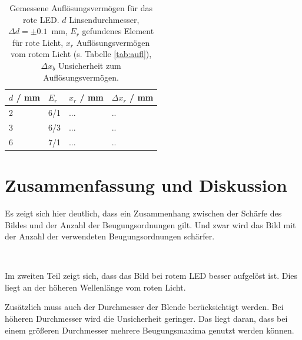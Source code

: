 \documentclass{article}
\begin{document}
\begin{table}[H]
\caption{Gemessene Auflösungsvermögen für das rote LED. $d$ Linsendurchmesser, $\Delta d = \pm 0.1$~mm, $E_r$ gefundenes Element für rote Licht, $x_r$ Auflösungsvermögen vom rotem Licht (s. Tabelle \ref{tab:aufl}), $\Delta x_b$ Unsicherheit zum Auflösungsvermögen.}

\begin{tabular}{llll}
$d$ / mm & $E_r$ & $x_r$ / mm & $\Delta x_r$ / mm \\
\hline
2 & 6/1 & ... & .. \\
3 & 6/3 & ... & .. \\
6 & 7/1 & ... & .. 
\end{tabular}
\end{table}






\section{Zusammenfassung und Diskussion}

Es zeigt sich hier deutlich, dass ein Zusammenhang zwischen der Schärfe des Bildes und der Anzahl der Beugungsordnungen gilt. Und zwar wird das Bild mit der Anzahl der verwendeten Beugungsordnungen schärfer.

~

Im zweiten Teil zeigt sich, dass das Bild bei rotem LED besser aufgelöst ist. Dies liegt an der höheren Wellenlänge vom roten Licht.

Zusätzlich muss auch der Durchmesser der Blende berücksichtigt werden. Bei höheren Durchmesser wird die Unsicherheit geringer. Das liegt daran, dass bei einem größeren Durchmesser mehrere Beugungsmaxima genutzt werden können.









%
\end{document}
